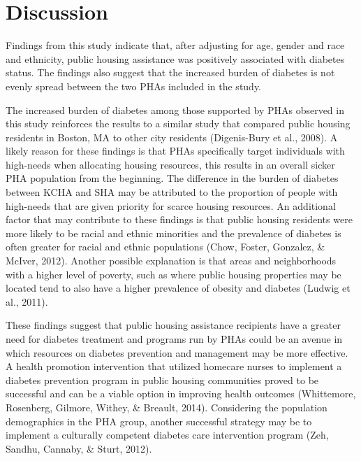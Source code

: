 \documentclass [11pt, proquest] {uwthesis}[2015/03/03]
\begin{document}
\section{Discussion}\label{discussion-1}

Findings from this study indicate that, after adjusting for age, gender
and race and ethnicity, public housing assistance was positively
associated with diabetes status. The findings also suggest that the
increased burden of diabetes is not evenly spread between the two PHAs
included in the study.

The increased burden of diabetes among those supported by PHAs observed
in this study reinforces the results to a similar study that compared
public housing residents in Boston, MA to other city residents
(Digenis-Bury et al., 2008). A likely reason for these findings is that
PHAs specifically target individuals with high-needs when allocating
housing resources, this results in an overall sicker PHA population from
the beginning. The difference in the burden of diabetes between KCHA and
SHA may be attributed to the proportion of people with high-needs that
are given priority for scarce housing resources. An additional factor
that may contribute to these findings is that public housing residents
were more likely to be racial and ethnic minorities and the prevalence
of diabetes is often greater for racial and ethnic populations (Chow,
Foster, Gonzalez, \& McIver, 2012). Another possible explanation is that
areas and neighborhoods with a higher level of poverty, such as where
public housing properties may be located tend to also have a higher
prevalence of obesity and diabetes (Ludwig et al., 2011).

These findings suggest that public housing assistance recipients have a
greater need for diabetes treatment and programs run by PHAs could be an
avenue in which resources on diabetes prevention and management may be
more effective. A health promotion intervention that utilized homecare
nurses to implement a diabetes prevention program in public housing
communities proved to be successful and can be a viable option in
improving health outcomes (Whittemore, Rosenberg, Gilmore, Withey, \&
Breault, 2014). Considering the population demographics in the PHA
group, another successful strategy may be to implement a culturally
competent diabetes care intervention program (Zeh, Sandhu, Cannaby, \&
Sturt, 2012).
\end{document}
